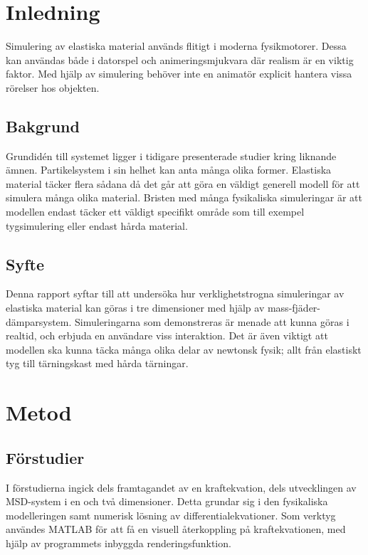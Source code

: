 \documentclass[a4paper,12pt,oneside,final,swedish]{extarticle}
\begin{document}
\tableofcontents  %
\listoffigures    %
\listoftables     %

\pagebreak
\pagestyle{plain}
\setcounter{page}{1}

\section{Inledning}
Simulering av elastiska material används flitigt i moderna fysikmotorer. Dessa kan användas både i datorspel och animeringsmjukvara där realism är en viktig faktor. Med hjälp av simulering behöver inte en animatör explicit hantera vissa rörelser hos objekten.
\subsection{Bakgrund}
Grundidén till systemet ligger i tidigare presenterade studier kring liknande ämnen. Partikelsystem i sin helhet kan anta många olika former. Elastiska material täcker flera sådana då det går att göra en väldigt generell modell för att simulera många olika material. Bristen med många fysikaliska simuleringar är att modellen endast täcker ett väldigt specifikt område som till exempel tygsimulering eller endast hårda material.
\subsection{Syfte}
Denna rapport syftar till att undersöka hur verklighetstrogna simuleringar av elastiska material kan göras i tre dimensioner med hjälp av mass-fjäder-dämparsystem. Simuleringarna som demonstreras är menade att kunna göras i realtid, och erbjuda en användare viss interaktion. Det är även viktigt att modellen ska kunna täcka många olika delar av newtonsk fysik; allt från elastiskt tyg till tärningskast med hårda tärningar.

\section{Metod}
\subsection{Förstudier}
I förstudierna ingick dels framtagandet av en kraftekvation, dels utvecklingen av MSD-system i en och två dimensioner. Detta grundar sig i den fysikaliska modelleringen samt numerisk lösning av differentialekvationer. Som verktyg användes MATLAB för att få en visuell återkoppling på kraftekvationen, med hjälp av programmets inbyggda renderingsfunktion.
\end{document}
